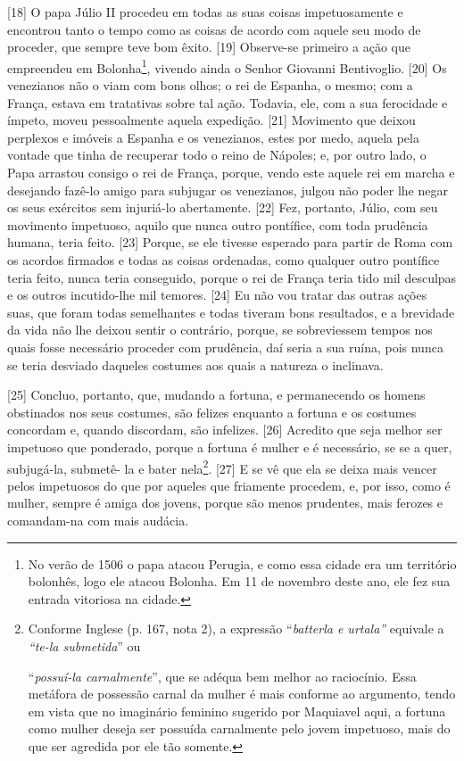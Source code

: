 {[}18{]} O papa Júlio II procedeu em todas as suas coisas impetuosamente
e encontrou tanto o tempo como as coisas de acordo com aquele seu modo
de proceder, que sempre teve bom êxito. {[}19{]} Observe-se primeiro a
ação que empreendeu em Bolonha\footnote{No verão de 1506 o papa atacou
  Perugia, e como essa cidade era um território bolonhês, logo ele
  atacou Bolonha. Em 11 de novembro deste ano, ele fez sua entrada
  vitoriosa na cidade.}, vivendo ainda o Senhor Giovanni Bentivoglio.
{[}20{]} Os venezianos não o viam com bons olhos; o rei de Espanha, o
mesmo; com a França, estava em tratativas sobre tal ação. Todavia, ele,
com a sua ferocidade e ímpeto, moveu pessoalmente aquela expedição.
{[}21{]} Movimento que deixou perplexos e imóveis a Espanha e os
venezianos, estes por medo, aquela pela vontade que tinha de recuperar
todo o reino de Nápoles; e, por outro lado, o Papa arrastou consigo o
rei de França, porque, vendo este aquele rei em marcha e desejando
fazê-lo amigo para subjugar os venezianos, julgou não poder lhe negar os
seus exércitos sem injuriá-lo abertamente. {[}22{]} Fez, portanto,
Júlio, com seu movimento impetuoso, aquilo que nunca outro pontífice,
com toda prudência humana, teria feito. {[}23{]} Porque, se ele tivesse
esperado para partir de Roma com os acordos firmados e todas as coisas
ordenadas, como qualquer outro pontífice teria feito, nunca teria
conseguido, porque o rei de França teria tido mil desculpas e os outros
incutido-lhe mil temores. {[}24{]} Eu não vou tratar das outras ações
suas, que foram todas semelhantes e todas tiveram bons resultados, e a
brevidade da vida não lhe deixou sentir o contrário, porque, se
sobreviessem tempos nos quais fosse necessário proceder com prudência,
daí seria a sua ruína, pois nunca se teria desviado daqueles costumes
aos quais a natureza o inclinava.

{[}25{]} Concluo, portanto, que, mudando a fortuna, e permanecendo os
homens obstinados nos seus costumes, são felizes enquanto a fortuna e os
costumes concordam e, quando discordam, são infelizes. {[}26{]} Acredito
que seja melhor ser impetuoso que ponderado, porque a fortuna é mulher e
é necessário, se se a quer, subjugá-la, submetê- la e bater
nela\footnote{Conforme Inglese (p. 167, nota 2), a expressão
  ``\emph{batterla e urtala''} equivale a \emph{``te-la submetida}'' ou

  ``\emph{possuí-la carnalmente}'', que se adéqua bem melhor ao
  raciocínio. Essa metáfora de possessão carnal da mulher é mais
  conforme ao argumento, tendo em vista que no imaginário feminino
  sugerido por Maquiavel aqui, a fortuna como mulher deseja ser possuída
  carnalmente pelo jovem impetuoso, mais do que ser agredida por ele tão
  somente.}. {[}27{]} E se vê que ela se deixa mais vencer pelos
impetuosos do que por aqueles que friamente procedem, e, por isso, como
é mulher, sempre é amiga dos jovens, porque são menos prudentes, mais
ferozes e comandam-na com mais audácia.

